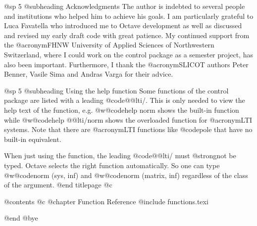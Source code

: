 @sp 5
@subheading Acknowledgments
The author is indebted to several people and institutions who helped
him to achieve his goals. I am particularly grateful to Luca Favatella
who introduced me to Octave development as well as discussed and revised
my early draft code with great patience. My continued support from the
@acronym{FHNW} University of Applied Sciences of Northwestern Switzerland,
where I could work on the control package as a semester project, has also
been important. Furthermore, I thank the @acronym{SLICOT} authors
Peter Benner, Vasile Sima and Andras Varga for their advice.


@sp 5
@subheading Using the help function
Some functions of the control package are listed with a leading @code{@@lti/}.
This is only needed to view the help text of the function, e.g. @w{@code{help norm}}
shows the built-in function while @w{@code{help @@lti/norm}} shows the overloaded
function for @acronym{LTI} systems. Note that there are @acronym{LTI} functions
like @code{pole} that have no built-in equivalent.

When just using the function, the leading @code{@@lti/} must @strong{not} be typed.
Octave selects the right function automatically. So one can type @w{@code{norm (sys, inf)}}
and @w{@code{norm (matrix, inf)}} regardless of the class of the argument.
@end titlepage
@c %

@contents
@c @chapter Function Reference
@include functions.texi

@end
@bye
